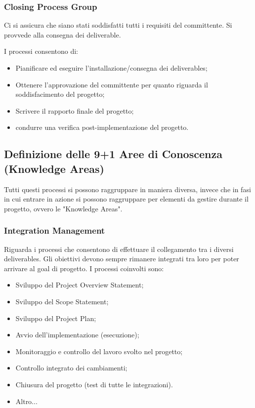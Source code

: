 \subsubsection{Closing Process Group}
\begin{info}
	Ci si assicura che siano stati soddisfatti tutti i requisiti del committente. Si provvede alla consegna dei deliverable.
\end{info}
I processi consentono di:
\begin{itemize}
	\item Pianificare ed eseguire l'installazione/consegna dei deliverables;
	\item Ottenere l'approvazione del committente per quanto riguarda il soddisfacimento del progetto;
	\item Scrivere il rapporto finale del progetto;
	\item condurre una verifica post-implementazione del progetto.
\end{itemize}
\subsection{Definizione delle 9+1 Aree di Conoscenza (Knowledge Areas)}
Tutti questi processi si possono raggruppare in maniera diversa, invece che in fasi in cui entrare in azione si possono raggruppare per elementi da gestire durante il progetto, ovvero le "Knowledge Areas".
\subsubsection{Integration Management}
Riguarda i processi che consentono di effettuare il collegamento tra i diversi deliverables. Gli obiettivi devono sempre rimanere integrati tra loro per poter arrivare al goal di progetto. I processi coinvolti sono:
\begin{itemize}
	\item Sviluppo del Project Overview Statement;
	\item Sviluppo del Scope Statement;
	\item Sviluppo del Project Plan;
	\item Avvio dell’implementazione (esecuzione);
	\item Monitoraggio e controllo del lavoro svolto nel progetto;
	\item Controllo integrato dei cambiamenti;
	\item Chiusura del progetto (test di tutte le integrazioni).
	\item Altro...
\end{itemize}
